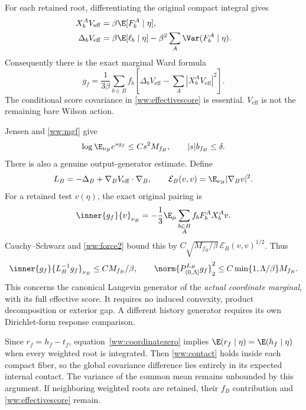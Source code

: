 For each retained root, differentiating the original compact integral gives
\begin{align}
 X_b^AV_{\mathrm{eff}}&=\beta\E[F_b^A\mid\eta],\notag\\
 \Delta_bV_{\mathrm{eff}}
 &=\beta\E[\ell_b\mid\eta]
       -\beta^2\sum_A\Var(F_b^A\mid\eta).
 \label{ww:effectivescore}
\end{align}
Consequently there is the exact marginal Ward formula
\begin{equation}
 g_f=\frac1{3\beta}\sum_{b\in B}f_b
       \left[\Delta_bV_{\mathrm{eff}}
               -\sum_A|X_b^AV_{\mathrm{eff}}|^2\right].
 \label{ww:effectiveward}
\end{equation}
The conditional score covariance in \eqref{ww:effectivescore} is essential. $V_{\mathrm{eff}}$ is not the remaining bare Wilson action.

Jensen and \eqref{ww:mgf} give
\begin{equation}
 \log\E_{\nu_B}e^{s g_f}\le Cs^2M_{f_B},
 \qquad |s|b_{f_B}\le\delta.
 \label{ww:marginalmgf}
\end{equation}
There is also a genuine output-generator estimate. Define
\[
 L_B=-\Delta_B+\nabla_BV_{\mathrm{eff}}\cdot\nabla_B,
 \qquad
 \mathcal E_B(v,v)=\E_{\nu_B}|\nabla_Bv|^2.
\]
For a retained test $v(\eta)$, the exact original pairing is
\[
 \inner{g_f}{v}_{\nu_B}
 =-\frac13\E_\mu\sum_{\substack{b\in B\\A}}
                   f_bF_b^AX_b^Av.
\]
Cauchy--Schwarz and \eqref{ww:force2} bound this by
$C\sqrt{M_{f_B}/\beta}\,\mathcal E_B(v,v)^{1/2}$. Thus
\begin{equation}
 \inner{g_f}{L_B^{-1}g_f}_{\nu_B}\le CM_{f_B}/\beta,
 \qquad
 \norm{P_{(0,\Lambda]}^{L_B}g_f}_2^2
       \le C\min\{1,\Lambda/\beta\}M_{f_B}.
 \label{ww:marginallow}
\end{equation}
This concerns the canonical Langevin generator of the \emph{actual coordinate marginal}, with its full effective score. It requires no induced convexity, product decomposition or exterior gap. A different history generator requires its own Dirichlet-form response comparison.

Since $r_f=h_f-t_f$, equation~\eqref{ww:coordinatezero} implies
$\E(r_f\mid\eta)=\E(h_f\mid\eta)$ when every weighted root is integrated. Then \eqref{ww:contact} holds inside each compact fiber, so the global covariance difference lies entirely in its expected internal contact. The variance of the common mean remains unbounded by this argument. If neighboring weighted roots are retained, their $f_B$ contribution and \eqref{ww:effectivescore} remain.

